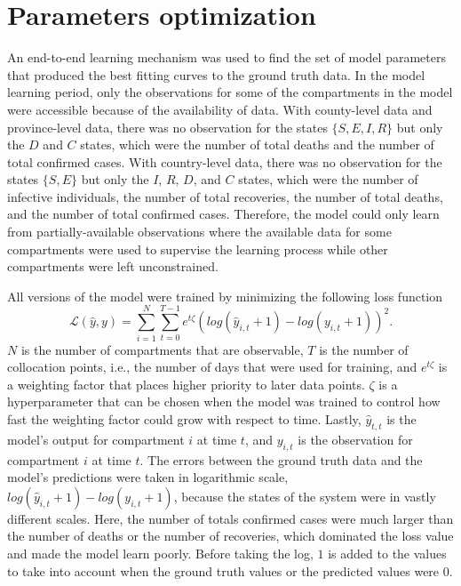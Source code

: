 \section{Parameters optimization}
\label{sec:methodologies-parameters-optimization}

An end-to-end learning mechanism was used to find the set of model parameters that produced the best fitting curves to the ground truth data.
In the model learning period, only the observations for some of the compartments in the model were accessible because of the availability of data.
With county-level data and province-level data, there was no observation for the states $\{S, E, I, R\}$ but only the $D$ and $C$ states, which were the number of total deaths and the number of total confirmed cases.
With country-level data, there was no observation for the states $\{S, E\}$ but only the $I$, $R$, $D$, and $C$ states, which were the number of infective individuals, the number of total recoveries, the number of total deaths, and the number of total confirmed cases.
Therefore, the model could only learn from partially-available observations where the available data for some compartments were used to supervise the learning process while other compartments were left unconstrained.

All versions of the model were trained by minimizing the following loss function
\begin{equation}
    \mathcal{L}(\hat{y}, y) = \sum_{i=1}^N \sum_{t=0}^{T-1} e^{t\zeta} (log(\hat{y}_{i,t} + 1) - log(y_{i,t} + 1))^2.
    \label{eq:ude-model-loss}
\end{equation}
$N$ is the number of compartments that are observable, $T$ is the number of collocation points, i.e., the number of days that were used for training, and $e^{t\zeta}$ is a weighting factor that places higher priority to later data points.
$\zeta$ is a hyperparameter that can be chosen when the model was trained to control how fast the weighting factor could grow with respect to time.
Lastly, $\hat{y}_{t,t}$ is the model's output for compartment $i$ at time $t$, and $y_{i,t}$ is the observation for compartment $i$ at time $t$.
The errors between the ground truth data and the model's predictions were taken in logarithmic scale, $log(\hat{y}_{i,t} + 1) - log(y_{i,t} + 1)$, because the states of the system were in vastly different scales.
Here, the number of totals confirmed cases were much larger than the number of deaths or the number of recoveries, which dominated the loss value and made the model learn poorly.
Before taking the log, $1$ is added to the values to take into account when the ground truth values or the predicted values were $0$.

